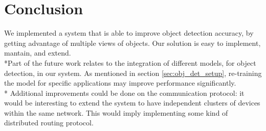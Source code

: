 \documentclass[10pt,conference,compsocconf]{IEEEtran}
\begin{document}
\section{Conclusion}
\label{sec:conclusion}
We implemented a system that is able to improve object detection accuracy, by getting advantage of multiple views of objects. Our solution is easy to implement, mantain, and extend.
\\*Part of the future work relates to the integration of different models, for object detection, in our system. As mentioned in section \ref{sec:obj_det_setup}, re-training the model for specific applications may improve performance significantly.\\*
Additional improvements could be done on the communication protocol: it would be interesting to extend the system to have independent clusters of devices within the same network. This would imply implementing some kind of distributed routing protocol.
\end{document}
